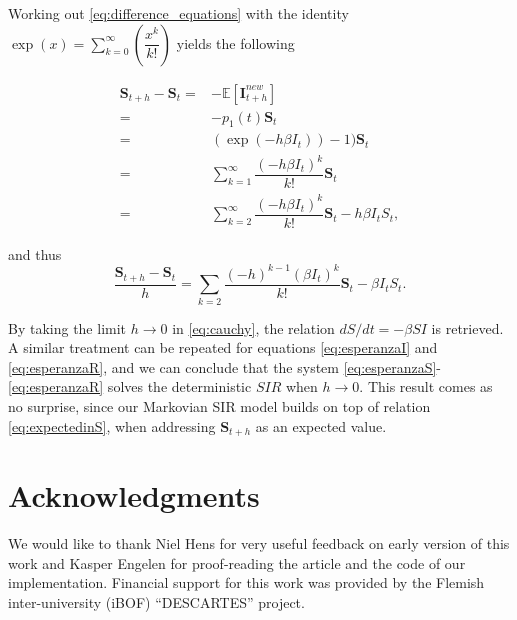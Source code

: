 \documentclass[a4paper,preprint]{elsarticle}
\renewcommand{\vec}[1]{\boldsymbol{#1}}
\begin{document}
Working out \eqref{eq:difference_equations} with the identity $\exp(x)=\sum_{k=0}^{\infty}\left(\dfrac{x^k}{k!}\right)$ yields the following

\begin{equation*}
    \begin{split}
    \vec{S}_{t+h}-\vec{S}_{t} = {} & -\mathbb{E}[\vec{I}_{t+h}^{new}]\\
    ={}&-p_1(t)\vec{S}_{t}\\
    ={}&(\exp(-h\beta I_t))-1)\vec{S}_{t}\\
    ={}&\sum_{k=1}^{\infty}\dfrac{(-h\beta I_t)^k}{k!}\vec{S}_{t}\\
    ={}&\sum_{k=2}^{\infty}\dfrac{(-h\beta I_t)^k}{k!}\vec{S}_{t}-h\beta I_t S_t,
    \end{split}\end{equation*}

and thus
\begin{equation}
\label{eq:cauchy}
\dfrac{\vec{S}_{t+h}-\vec{S}_{t}}{h}=\sum_{k=2}\dfrac{(-h)^{k-1}(\beta I_t)^{k}}{k!}\vec{S}_{t}-\beta I_t S_t.
\end{equation}

By taking the limit $h\rightarrow{0}$ in \eqref{eq:cauchy}, the relation $dS/dt =  -\beta SI$ is retrieved. A similar treatment can be repeated for equations \eqref{eq:esperanzaI} and \eqref{eq:esperanzaR}, and we can conclude that the system \eqref{eq:esperanzaS}-\eqref{eq:esperanzaR} solves the deterministic $SIR$ when $h\rightarrow{0}$. This result comes as no surprise, since our Markovian SIR model builds on top of relation \eqref{eq:expectedinS}, when addressing $\vec{S}_{t+h}$ as an expected value.

\section*{Acknowledgments}
We would like to thank Niel Hens for very useful feedback on early version of this work and Kasper Engelen for proof-reading the article and the code of our implementation.
Financial support for this work was provided by the Flemish inter-university (iBOF) ``DESCARTES'' project.





\end{document}
